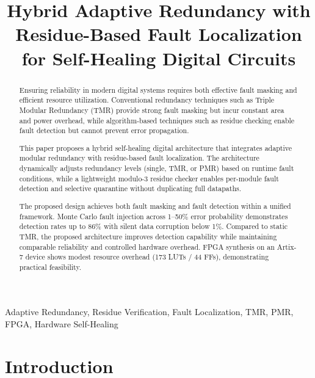 \documentclass[conference]{IEEEtran}
\begin{document}
\title{Hybrid Adaptive Redundancy with Residue-Based Fault Localization for Self-Healing Digital Circuits}

\author{
}

\maketitle

\begin{abstract}
Ensuring reliability in modern digital systems requires both effective fault masking and efficient resource utilization. 
Conventional redundancy techniques such as Triple Modular Redundancy (TMR) provide strong fault masking but incur constant area and power overhead, while algorithm-based techniques such as residue checking enable fault detection but cannot prevent error propagation.

This paper proposes a hybrid self-healing digital architecture that integrates adaptive modular redundancy with residue-based fault localization. 
The architecture dynamically adjusts redundancy levels (single, TMR, or PMR) based on runtime fault conditions, while a lightweight modulo-3 residue checker enables per-module fault detection and selective quarantine without duplicating full datapaths.

The proposed design achieves both fault masking and fault detection within a unified framework. 
Monte Carlo fault injection across 1–50\% error probability demonstrates detection rates up to 86\% with silent data corruption below 1\%. 
Compared to static TMR, the proposed architecture improves detection capability while maintaining comparable reliability and controlled hardware overhead. 
FPGA synthesis on an Artix-7 device shows modest resource overhead (173 LUTs / 44 FFs), demonstrating practical feasibility.

\end{abstract}

\begin{IEEEkeywords}
Adaptive Redundancy, Residue Verification, Fault Localization, TMR, PMR, FPGA, Hardware Self-Healing
\end{IEEEkeywords}

\section{Introduction}
\label{sec:intro}
\end{document}
